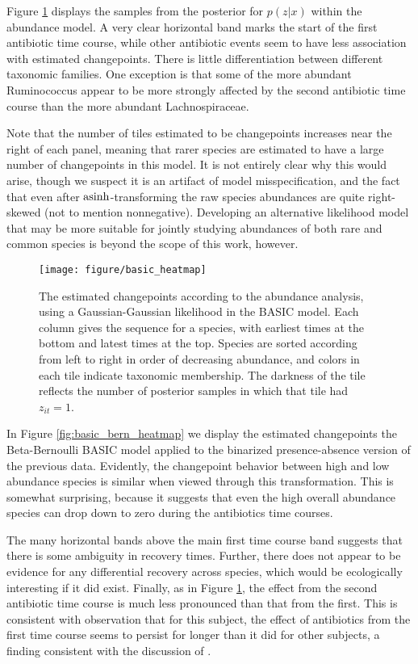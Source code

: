 \documentclass{article}
\begin{document}
Figure \ref{fig:basic_heatmap} displays the samples from the posterior for
$p\left(z \vert x\right)$ within the abundance model. A very clear horizontal
band marks the start of the first antibiotic time course, while other antibiotic
events seem to have less association with estimated changepoints. There is
little differentiation between different taxonomic families. One exception is
that some of the more abundant Ruminococcus appear to be more strongly affected
by the second antibiotic time course than the more abundant Lachnospiraceae.

Note that the number of tiles estimated to be changepoints increases near the
right of each panel, meaning that rarer species are estimated to have a large
number of changepoints in this model. It is not entirely clear why this would
arise, though we suspect it is an artifact of model misspecification, and the
fact that even after $\mathop\mathrm{asinh}$-transforming the raw species abundances are quite
right-skewed (not to mention nonnegative). Developing an alternative likelihood
model that may be more suitable for jointly studying abundances of both rare and
common species is beyond the scope of this work, however.

\begin{figure}[ht]
  \centering
  \texttt{[image: figure/basic\_heatmap]}
  \caption{The estimated changepoints according to the abundance analysis, using
    a Gaussian-Gaussian likelihood in the BASIC model. Each column gives the
    sequence for a species, with earliest times at the bottom and latest times
    at the top. Species are sorted according from left to right in order of
    decreasing abundance, and colors in each tile indicate taxonomic membership.
    The darkness of the tile reflects the number of posterior samples in which
    that tile had $z_{it} = 1$.
    \label{fig:basic_heatmap} }
\end{figure}

In Figure \ref{fig:basic_bern_heatmap} we display the estimated changepoints the
Beta-Bernoulli BASIC model applied to the binarized presence-absence version of
the previous data. Evidently, the changepoint behavior between high and low
abundance species is similar when viewed through this transformation. This is
somewhat surprising, because it suggests that even the high overall abundance
species can drop down to zero during the antibiotics time courses.

The many horizontal bands above the main first time course band suggests that
there is some ambiguity in recovery times. Further, there does not appear to be
evidence for any differential recovery across species, which would be
ecologically interesting if it did exist. Finally, as in Figure
\ref{fig:basic_heatmap}, the effect from the second antibiotic time course is
much less pronounced than that from the first. This is consistent with
observation that for this subject, the effect of antibiotics from the first time
course seems to persist for longer than it did for other subjects, a finding
consistent with the discussion of \cite{dethlefsen2011incomplete}.
\end{document}
